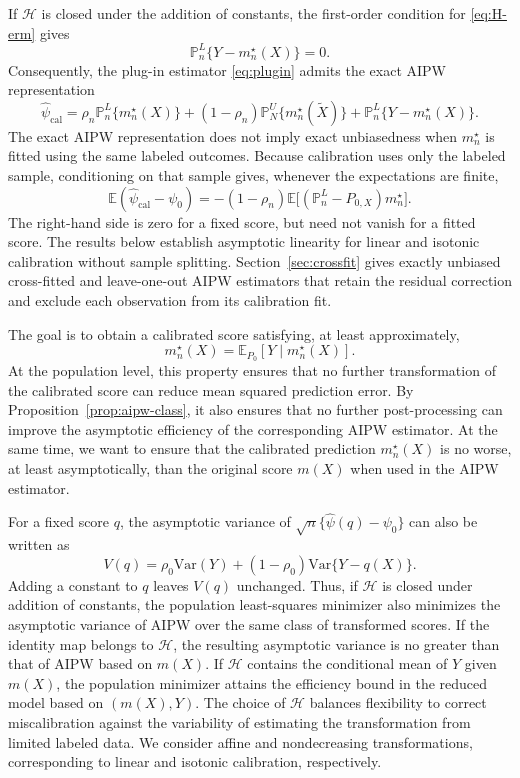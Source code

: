 \documentclass{article}
\theoremstyle{plain}
\theoremstyle{definition}
\newcommand{\E}{\mathbb{E}}
\newcommand{\Var}{\mathrm{Var}}
\newcommand{\1}{\mathbbm{1}}
\newcommand{\psihat}{\widehat{\psi}_{\mathrm{cal}}}
\newcommand{\rhon}{\rho_n}
\newcommand{\mtilde}{m_n^\star}
\newcommand{\Pl}{\mathbb{P}^{L}_n}
\newcommand{\Pu}{\mathbb{P}^{U}_N}
\newcommand{\Px}{P_{0,X}}
\begin{document}
If $\mathcal H$ is closed under the addition of constants,
the first-order condition for \eqref{eq:H-erm} gives
\[
\Pl\{Y-\mtilde(X)\}=0.
\]
Consequently, the plug-in estimator \eqref{eq:plugin}
admits the exact AIPW representation
\begin{equation}
\label{eqn::aipwcal}
\psihat
=
\rhon \Pl\{\mtilde(X)\}
+
(1-\rhon)\Pu\{\mtilde(\widetilde X)\}
+
\Pl\{Y-\mtilde(X)\}.
\end{equation}
The exact AIPW representation does not imply exact unbiasedness when
\(\mtilde\) is fitted using the same labeled outcomes. Because calibration
uses only the labeled sample, conditioning on that sample gives, whenever
the expectations are finite,
\[
\E(\psihat-\psi_0)
=-(1-\rho_n)\E\bigl[(\Pl-\Px)\mtilde\bigr].
\]
The right-hand side is zero for a fixed score, but need not vanish for a
fitted score. The results below establish asymptotic linearity for linear
and isotonic calibration without sample splitting.
Section~\ref{sec:crossfit} gives exactly unbiased cross-fitted and
leave-one-out AIPW estimators that retain the residual correction and
exclude each observation from its calibration fit.

The goal is to obtain a calibrated score satisfying, at least
approximately,
\[
\mtilde(X)=\E_{P_0}[Y\mid\mtilde(X)].
\]
At the population level, this property ensures that no further
transformation of the calibrated score can reduce mean squared
prediction error. By Proposition~\ref{prop:aipw-class}, it also
ensures that no further post-processing can improve the
asymptotic efficiency of the corresponding AIPW estimator. At the same time, we want to ensure that the calibrated prediction $\mtilde(X)$ is no worse, at least asymptotically, than the original score $m(X)$ when used in the AIPW estimator.

For a fixed score \(q\), the asymptotic variance of
\(\sqrt n\{\widehat\psi(q)-\psi_0\}\) can also be written as
\[
V(q)=\rho_0\Var(Y)+(1-\rho_0)\Var\{Y-q(X)\}.
\]
Adding a constant to \(q\) leaves \(V(q)\) unchanged.
Thus, if $\mathcal H$ is closed under addition of constants,
the population least-squares minimizer also minimizes the
asymptotic variance of AIPW over the same class of transformed scores.
If the identity map belongs to $\mathcal H$, the resulting
asymptotic variance is no greater than that of AIPW based on $m(X)$.
If $\mathcal H$ contains the conditional mean of $Y$ given $m(X)$,
the population minimizer attains the efficiency bound in the reduced
model based on $(m(X),Y)$. The choice of
$\mathcal H$ balances flexibility to correct miscalibration
against the variability of estimating the transformation
from limited labeled data. We consider affine and
nondecreasing transformations, corresponding to linear
and isotonic calibration, respectively.
\end{document}
